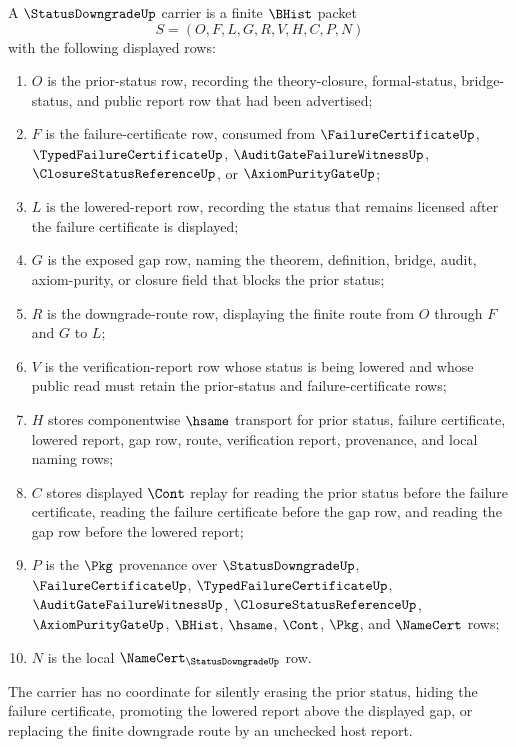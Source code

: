 \begin{definition}
\label{def:status-downgrade-carrier}
A $\StatusDowngradeUp$ carrier is a finite $\BHist$ packet
$$
S=(O,F,L,G,R,V,H,C,P,N)
$$
with the following displayed rows:
\begin{enumerate}
\item $O$ is the prior-status row, recording the theory-closure, formal-status, bridge-status, and public report row that had been advertised;
\item $F$ is the failure-certificate row, consumed from $\FailureCertificateUp$, $\TypedFailureCertificateUp$, $\AuditGateFailureWitnessUp$, $\ClosureStatusReferenceUp$, or $\AxiomPurityGateUp$;
\item $L$ is the lowered-report row, recording the status that remains licensed after the failure certificate is displayed;
\item $G$ is the exposed gap row, naming the theorem, definition, bridge, audit, axiom-purity, or closure field that blocks the prior status;
\item $R$ is the downgrade-route row, displaying the finite route from $O$ through $F$ and $G$ to $L$;
\item $V$ is the verification-report row whose status is being lowered and whose public read must retain the prior-status and failure-certificate rows;
\item $H$ stores componentwise $\hsame$ transport for prior status, failure certificate, lowered report, gap row, route, verification report, provenance, and local naming rows;
\item $C$ stores displayed $\Cont$ replay for reading the prior status before the failure certificate, reading the failure certificate before the gap row, and reading the gap row before the lowered report;
\item $P$ is the $\Pkg$ provenance over $\StatusDowngradeUp$, $\FailureCertificateUp$, $\TypedFailureCertificateUp$, $\AuditGateFailureWitnessUp$, $\ClosureStatusReferenceUp$, $\AxiomPurityGateUp$, $\BHist$, $\hsame$, $\Cont$, $\Pkg$, and $\NameCert$ rows;
\item $N$ is the local $\NameCert_{\StatusDowngradeUp}$ row.
\end{enumerate}
The carrier has no coordinate for silently erasing the prior status, hiding the failure certificate, promoting the lowered report above the displayed gap, or replacing the finite downgrade route by an unchecked host report.
\end{definition}


